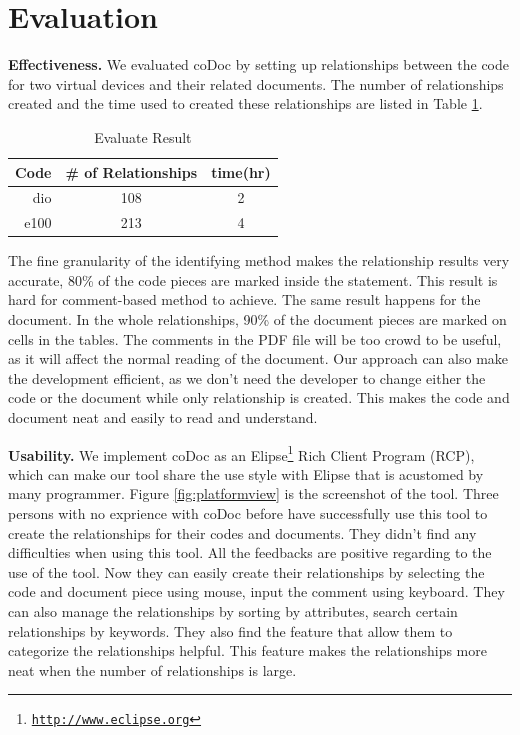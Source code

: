 \documentclass[11pt,letterpaper,oneside]{article}
\begin{document}
\section{Evaluation}
\label{sec:evaluation}
\textbf{Effectiveness.} We evaluated coDoc by setting up relationships between the code for two virtual devices and their related documents.
The number of relationships created and the time used to created these relationships are listed in Table \ref{table:evaluate}.

\begin{table}[th]
\caption{Evaluate Result}
\centering
\begin{tabular}{rcc}
\hline
Code & \# of Relationships & time(hr) \\
\hline
dio & 108 & 2 \\
e100  & 213 & 4\\
\hline
\end{tabular}
\label{table:evaluate}
\end{table}

The fine granularity of the identifying method makes the relationship results very accurate, 
80\% of the code pieces are marked inside the statement.
This result is hard for comment-based method to achieve.
The same result happens for the document.
In the whole relationships, 
90\% of the document pieces are marked on cells in the tables.
The comments in the PDF file will be too crowd to be useful,
as it will affect the normal reading of the document.
Our approach can also make the development efficient,
as we don't need the developer to change either the code or the document while only relationship is created.
This makes the code and document neat and easily to read and understand.

\noindent \textbf{Usability.} We implement coDoc as an Elipse\footnote{\texttt{\url{http://www.eclipse.org}}} Rich Client Program (RCP), 
which can make our tool share the use style with Elipse that is acustomed by many programmer.
Figure \ref{fig:platformview} is the screenshot of the tool.
Three persons with no exprience with coDoc before have successfully use this tool to create the relationships for their codes and documents.
They didn't find any difficulties when using this tool.
All the feedbacks are positive regarding to the use of the tool.
Now they can easily create their relationships by selecting the code and document piece using mouse, input the comment using keyboard.
They can also manage the relationships by sorting by attributes, search certain relationships by keywords.
They also find the feature that allow them to categorize the relationships helpful.
This feature makes the relationships more neat when the number of relationships is large.
\end{document}
